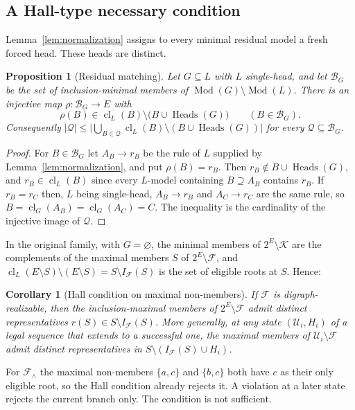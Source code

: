 \documentclass[11pt,a4paper]{article}
\theoremstyle{plain}
\newtheorem{proposition}[theorem]{Proposition}
\newtheorem{corollary}[theorem]{Corollary}
\theoremstyle{definition}
\theoremstyle{remark}
\newcommand{\cB}{\mathcal B}
\newcommand{\cF}{\mathcal F}
\newcommand{\cK}{\mathcal K}
\newcommand{\cQ}{\mathcal Q}
\newcommand{\cU}{\mathcal U}
\newcommand{\Mod}{\operatorname{Mod}}
\newcommand{\cl}{\operatorname{cl}}
\newcommand{\Heads}{\operatorname{Heads}}
\newcommand{\Int}{I_{\cF}}
\newcommand{\pw}[1]{2^{#1}}
\begin{document}
\subsection{A Hall-type necessary condition}

Lemma~\ref{lem:normalization} assigns to every minimal residual model a fresh forced head. These heads are distinct.

\begin{proposition}[Residual matching]\label{prop:hall}
Let $G\subseteq L$ with $L$ single-head, and let $\cB_G$ be the set of inclusion-minimal members of $\Mod(G)\setminus\Mod(L)$. There is an injective map $\rho:\cB_G\to E$ with
\[
 \rho(B)\in\cl_L(B)\setminus\bigl(B\cup\Heads(G)\bigr)\qquad(B\in\cB_G).
\]
Consequently $|\cQ|\le\bigl|\bigcup_{B\in\cQ}\cl_L(B)\setminus(B\cup\Heads(G))\bigr|$ for every $\cQ\subseteq\cB_G$.
\end{proposition}

\begin{proof}
For $B\in\cB_G$ let $A_B\to r_B$ be the rule of $L$ supplied by Lemma~\ref{lem:normalization}, and put $\rho(B)=r_B$. Then $r_B\notin B\cup\Heads(G)$, and $r_B\in\cl_L(B)$ since every $L$-model containing $B\supseteq A_B$ contains $r_B$. If $r_B=r_C$ then, $L$ being single-head, $A_B\to r_B$ and $A_C\to r_C$ are the same rule, so $B=\cl_G(A_B)=\cl_G(A_C)=C$. The inequality is the cardinality of the injective image of $\cQ$.
\end{proof}

In the original family, with $G=\varnothing$, the minimal members of $\pw{E}\setminus\cK$ are the complements of the maximal members $S$ of $\pw{E}\setminus\cF$, and $\cl_L(E\setminus S)\setminus(E\setminus S)=S\setminus\Int(S)$ is the set of eligible roots at $S$. Hence:

\begin{corollary}[Hall condition on maximal non-members]\label{cor:hall}
If $\cF$ is digraph-realizable, then the inclusion-maximal members of $\pw{E}\setminus\cF$ admit distinct representatives $r(S)\in S\setminus\Int(S)$. More generally, at any state $(\cU_i,H_i)$ of a legal sequence that extends to a successful one, the maximal members of $\cU_i\setminus\cF$ admit distinct representatives in $S\setminus(\Int(S)\cup H_i)$.
\end{corollary}

For $\cF_\wedge$ the maximal non-members $\{a,c\}$ and $\{b,c\}$ both have $c$ as their only eligible root, so the Hall condition already rejects it. A violation at a later state rejects the current branch only. The condition is not sufficient.
\end{document}
